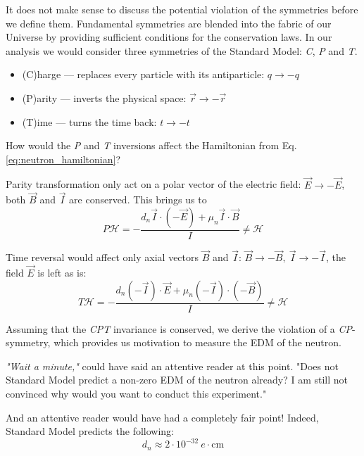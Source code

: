 It does not make sense to discuss the potential violation of the symmetries before we define them.  Fundamental symmetries are blended into the fabric of our Universe by providing sufficient conditions \cite{Noether1918} for the conservation laws. In our analysis we would consider three symmetries of the Standard Model: \textit{C}, \textit{P} and \textit{T}.

\begin{itemize}
	\item (C)harge –-- replaces every particle with its antiparticle: $q \rightarrow -q$
	\item (P)arity --- inverts the physical space: $\vec{r} \rightarrow -\vec{r}$
	\item (T)ime --- turns the time back: $t \rightarrow -t$
\end{itemize}

How would the \textit{P} and \textit{T} inversions affect \cite{Dubbers2011} the Hamiltonian from Eq. \ref{eq:neutron_hamiltonian}?

Parity transformation only act on a polar vector of the electric field: $\vec{E} \rightarrow -\vec{E}$, both $\vec{B}$ and $\vec{I}$ are conserved. This brings us to
\begin{equation}
	\textit{P}\mathcal{H} = -\frac{d_n \vec{I} \cdot \left(-\vec{E}\right) + \mu_n \vec{I} \cdot \vec{B}}{I} \neq \mathcal{H}
	\label{eq:neutron_hamiltonian_P}
\end{equation}

Time reversal would affect only axial vectors $\vec{B}$ and $\vec{I}$: $\vec{B} \rightarrow -\vec{B},\ \vec{I} \rightarrow -\vec{I}$, the field $\vec{E}$ is left as is:
\begin{equation}
	\textit{T}\mathcal{H} = -\frac{d_n \left(-\vec{I}\right) \cdot \vec{E} + \mu_n \left(-\vec{I}\right) \cdot \left( -\vec{B} \right)}{I} \neq \mathcal{H}
	\label{eq:neutron_hamiltonian_T}
\end{equation}

Assuming that the \textit{CPT} invariance \cite{Schwinger1951} is conserved, we derive the violation of a \textit{CP}-symmetry, which provides us motivation to measure the EDM of the neutron.

\textit{"Wait a minute,"} could have said an attentive reader at this point. "Does not Standard Model predict a non-zero EDM of the neutron already? I am still not convinced why would you want to conduct this experiment."

And an attentive reader would have had a completely fair point! Indeed, Standard Model predicts \cite{Khriplovich1982} the following:
\begin{equation}
	d_n \approx 2 \cdot 10^{-32}\ e \cdot \text{cm}
\end{equation}

